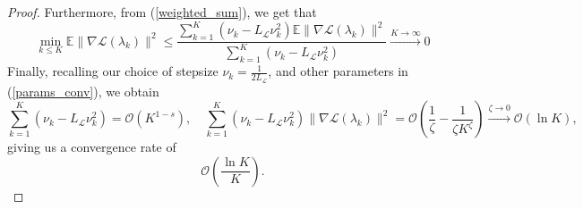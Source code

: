 \documentclass[11pt, twoside]{report}
\begin{document}
\begin{proof}
Furthermore, from (\ref{weighted_sum}), we get that
\[\min_{k \leq K} \mathbb{E}\|\nabla \mathcal{L}(\lambda_k)\|^2 \leq \frac{\sum_{k=1}^K (\nu_k - L_{\mathcal{L}}\nu_k^2)\mathbb{E}\|\nabla\mathcal{L}(\lambda_k)\|^2}{\sum_{k=1}^K (\nu_k - L_{\mathcal{L}}\nu_k^2)} \xrightarrow[]{K \to \infty} 0\]
Finally, recalling our choice of stepsize $\nu_k = \frac{1}{2L_\mathcal{L}}$, and other parameters in (\ref{params_conv}), we obtain
\[\sum_{k=1}^K (\nu_k - L_{\mathcal{L}}\nu_k^2) = \mathcal{O} \left(K^{1-s} \right), \quad \sum_{k=1}^K (\nu_k - L_{\mathcal{L}}\nu_k^2)\|\nabla\mathcal{L}(\lambda_k)\|^2 = \mathcal{O} \left(\frac{1}{\zeta} - \frac{1}{\zeta K^\zeta} \right) \xrightarrow[]{\zeta \to 0} \mathcal{O}\left(\ln{K} \right),\]
giving us a convergence rate of
\[\mathcal{O} \left(\frac{\ln{K}}{K} \right).\]

\end{proof}
\end{document}

